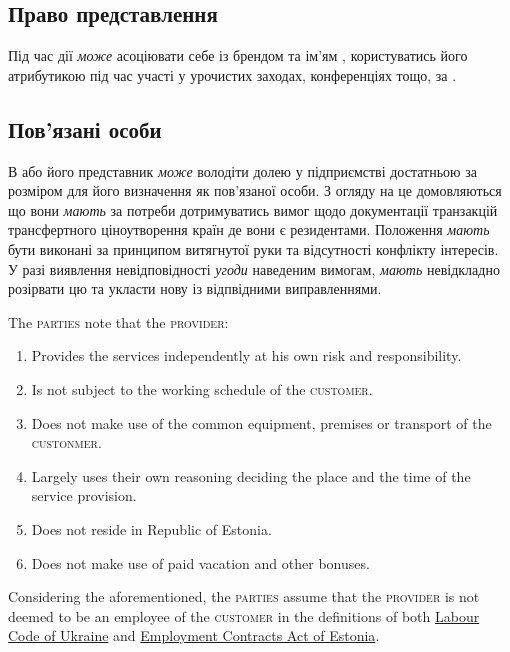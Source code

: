 \begin{Form}
\begin{paracol}{3}
{        \subsection{Право представлення}
        Під час дії   \textit{може} асоціювати себе із брендом та ім'ям , користуватись його атрибутикою під час участі у урочистих заходах, конференціях тощо, за .

        \subsection{Пов'язані особи}
        В або його представник \textit{може} володіти долею у підприємстві  достатньою за розміром для його визначення як пов’язаної особи. З огляду на це  домовляються що вони \textit{мають} за потреби дотримуватись вимог щодо документації транзакцій трансфертного ціноутворення країн де вони є резидентами. Положення  \textit{мають} бути виконані за принципом витягнутої руки та відсутності конфлікту інтересів. У разі виявлення невідповідності \textit{угоди} наведеним вимогам,  \textit{мають} невідкладно розірвати цю  та укласти нову із відпвідними виправленнями.}
        {The \textsc{parties} note that the \textsc{provider}:
        \begin{enumerate}
          \item Provides the services independently at his own risk and responsibility.
          \item Is not subject to the working schedule of the \textsc{customer}.
          \item Does not make use of the common equipment, premises or transport of the \textsc{custonmer}.
          \item Largely uses their own reasoning deciding the place and the time of the service provision.
          \item Does not reside in Republic of Estonia.
          \item Does not make use of paid vacation and other bonuses.
        \end{enumerate}

        Considering the aforementioned, the \textsc{parties} assume that the \textsc{provider} is not deemed to be an employee of the \textsc{customer} in the definitions of both \href{http://zakon2.rada.gov.ua/laws/show/322-08}{Labour Code of Ukraine} and \href{https://www.riigiteataja.ee/en/eli/530102013061/consolide}{Employment Contracts Act of Estonia}.

}
\end{paracol}
\end{Form}
